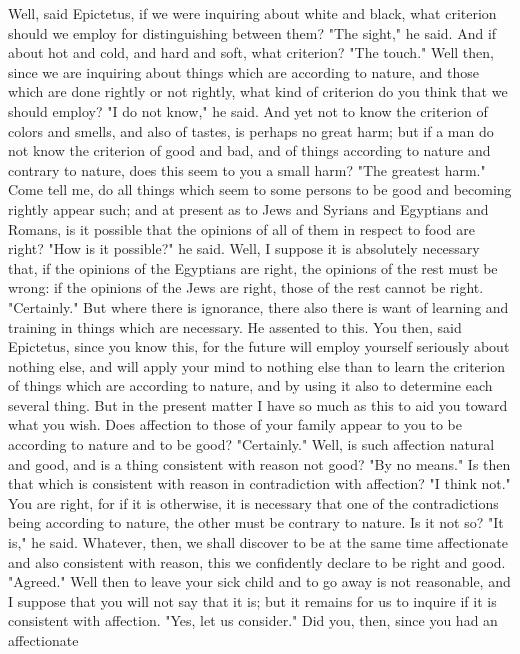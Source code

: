 \documentclass[a4paper]{article}
\begin{document}
Well, said Epictetus, if we were inquiring about white and black,
what criterion should we employ for distinguishing between them? "The
sight," he said. And if about hot and cold, and hard and soft, what
criterion? "The touch." Well then, since we are inquiring about things
which are according to nature, and those which are done rightly or
not rightly, what kind of criterion do you think that we should employ?
"I do not know," he said. And yet not to know the criterion of colors
and smells, and also of tastes, is perhaps no great harm; but if a
man do not know the criterion of good and bad, and of things according
to nature and contrary to nature, does this seem to you a small harm?
"The greatest harm." Come tell me, do all things which seem to some
persons to be good and becoming rightly appear such; and at present
as to Jews and Syrians and Egyptians and Romans, is it possible that
the opinions of all of them in respect to food are right? "How is
it possible?" he said. Well, I suppose it is absolutely necessary
that, if the opinions of the Egyptians are right, the opinions of
the rest must be wrong: if the opinions of the Jews are right, those
of the rest cannot be right. "Certainly." But where there is ignorance,
there also there is want of learning and training in things which
are necessary. He assented to this. You then, said Epictetus, since
you know this, for the future will employ yourself seriously about
nothing else, and will apply your mind to nothing else than to learn
the criterion of things which are according to nature, and by using
it also to determine each several thing. But in the present matter
I have so much as this to aid you toward what you wish. Does affection
to those of your family appear to you to be according to nature and
to be good? "Certainly." Well, is such affection natural and good,
and is a thing consistent with reason not good? "By no means." Is
then that which is consistent with reason in contradiction with affection?
"I think not." You are right, for if it is otherwise, it is necessary
that one of the contradictions being according to nature, the other
must be contrary to nature. Is it not so? "It is," he said. Whatever,
then, we shall discover to be at the same time affectionate and also
consistent with reason, this we confidently declare to be right and
good. "Agreed." Well then to leave your sick child and to go away
is not reasonable, and I suppose that you will not say that it is;
but it remains for us to inquire if it is consistent with affection.
"Yes, let us consider." Did you, then, since you had an affectionate
\end{document}

